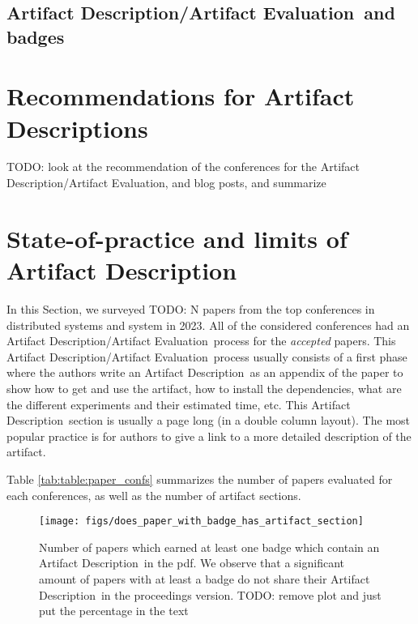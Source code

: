 \documentclass[sigconf,natbib=false]{acmart}
\newcommand{\ad}{Artifact Description}
\newcommand{\aeval}{Artifact Evaluation}
\newcommand{\adae}{\ad/\aeval}
\newcommand{\todo}[1]{{\color{red}TODO: #1}}
\begin{document}
\subsection{\adae\ and badges}

\cite{winter2022retrospective}
\cite{hermann2022has}
\cite{hermann2020community}

\cite{beller2020will}



%
\section{Recommendations for \ad s}

\todo{look at the recommendation of the conferences for the \adae, and blog posts, and summarize}

%
\section{State-of-practice and limits of \ad}\label{sec:sop}



In this Section, we surveyed \todo{N} papers from the top conferences in distributed systems and system in 2023.
All of the considered conferences had an \adae\ process for the \emph{accepted} papers.
This \adae\ process usually consists of a first phase where the authors write an \ad\ as an appendix of the paper to show how to get and use the artifact, how to install the dependencies, what are the different experiments and their estimated time, etc.
This \ad\ section is usually a page long (in a double column layout).
The most popular practice is for authors to give a link to a more detailed description of the artifact.

Table \ref{tab:table:paper_confs} summarizes the number of papers evaluated for each conferences, as well as the number of artifact sections.


\begin{figure}
  \centering
  \texttt{[image: figs/does\_paper\_with\_badge\_has\_artifact\_section]}
  \caption{Number of papers which earned at least one badge which contain an \ad\ in the pdf. We observe that a significant amount of papers with at least a badge do not share their \ad\ in the proceedings version. \todo{remove plot and just put the percentage in the text}}\label{fig:}
\end{figure}
\end{document}
